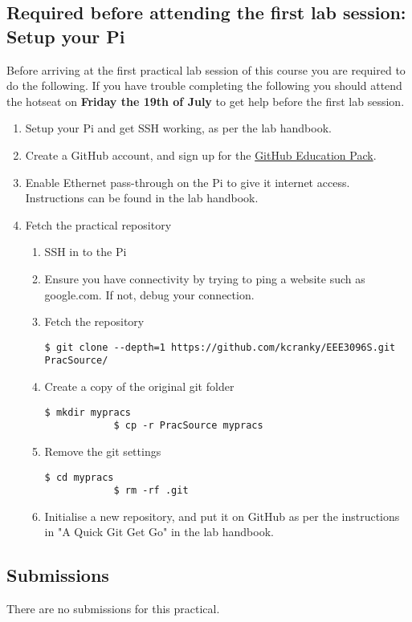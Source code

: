 \subsection{Required before attending the first lab session: Setup your Pi }
Before arriving at the first practical lab session of this course you are required to do the following. If you have trouble completing the following you should attend the hotseat on \textbf{Friday the 19th of July} to get help before the first lab session.
\begin{enumerate}
    \item Setup your Pi and get SSH working, as per the lab handbook.
    \item Create a GitHub account, and sign up for the \href{https://education.github.com/pack}{GitHub Education Pack}.
    \item Enable Ethernet pass-through on the Pi to give it internet access. Instructions can be found in the lab handbook.
    \item Fetch the practical repository
    \begin{enumerate}
        \item SSH in to the Pi
        \item Ensure you have connectivity by trying to ping a website such as google.com. If not, debug your connection.
        \item Fetch the repository
            \begin{lstlisting}[gobble=12]
            $ git clone --depth=1 https://github.com/kcranky/EEE3096S.git PracSource/
            \end{lstlisting}
        \item Create a copy of the original git folder
            \begin{lstlisting}[gobble=12]
            $ mkdir mypracs
            $ cp -r PracSource mypracs
            \end{lstlisting}
        \item Remove the git settings
            \begin{lstlisting}[gobble=12]
            $ cd mypracs
            $ rm -rf .git
            \end{lstlisting}
        \item Initialise a new repository, and put it on GitHub as per the instructions in "A Quick Git Get Go" in the lab handbook.
    \end{enumerate}
\end{enumerate}

\subsection{Submissions}
There are no submissions for this practical.

